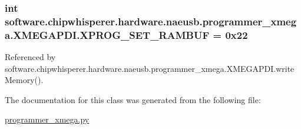 \subsubsection[{X\+P\+R\+O\+G\+\_\+\+S\+E\+T\+\_\+\+R\+A\+M\+B\+U\+F}]{\setlength{\rightskip}{0pt plus 5cm}int software.\+chipwhisperer.\+hardware.\+naeusb.\+programmer\+\_\+xmega.\+X\+M\+E\+G\+A\+P\+D\+I.\+X\+P\+R\+O\+G\+\_\+\+S\+E\+T\+\_\+\+R\+A\+M\+B\+U\+F = 0x22\hspace{0.3cm}{\ttfamily [static]}}\label{classsoftware_1_1chipwhisperer_1_1hardware_1_1naeusb_1_1programmer__xmega_1_1XMEGAPDI_a5b3c4dd9271917ac3e30fd0ac0fe12f0}


Referenced by software.\+chipwhisperer.\+hardware.\+naeusb.\+programmer\+\_\+xmega.\+X\+M\+E\+G\+A\+P\+D\+I.\+write\+Memory().



The documentation for this class was generated from the following file\+:\begin{DoxyCompactItemize}
\item 
\hyperlink{programmer__xmega_8py}{programmer\+\_\+xmega.\+py}\end{DoxyCompactItemize}
